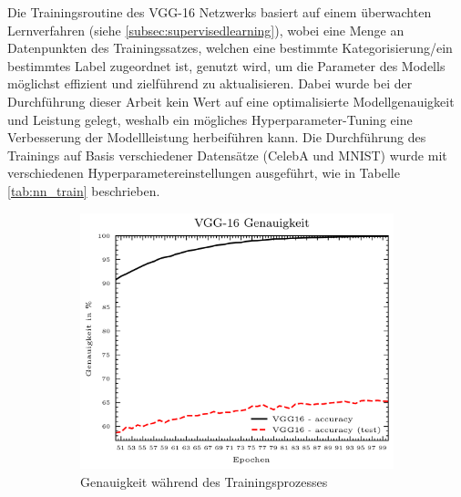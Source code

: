 Die Trainingsroutine des VGG-16 Netzwerks basiert auf einem überwachten Lernverfahren (siehe \ref{subsec:supervisedlearning}), wobei eine Menge an Datenpunkten des Trainingssatzes, welchen eine bestimmte Kategorisierung/ein bestimmtes Label zugeordnet ist, genutzt wird, um die Parameter des Modells möglichst effizient und zielführend zu aktualisieren. Dabei wurde bei der Durchführung dieser Arbeit kein Wert auf eine optimalisierte Modellgenauigkeit und Leistung gelegt, weshalb ein mögliches Hyperparameter-Tuning eine Verbesserung der Modellleistung herbeiführen kann. Die Durchführung des Trainings auf Basis verschiedener Datensätze (CelebA und MNIST) wurde mit verschiedenen Hyperparametereinstellungen ausgeführt, wie in Tabelle \ref{tab:nn_train} beschrieben.
\begin{figure}[H]
	\centering
	\begin{subfigure}[b]{0.35\linewidth}
		\includegraphics[width=\linewidth]{Bilder/celeba_nn_acc.png}
		\caption{Genauigkeit während des Trainingsprozesses}
		\label{img:celeba_nn_acc}
	\end{subfigure}
	\hspace{1cm} %
	\begin{subfigure}[b]{0.35\linewidth}

\end{subfigure}
\end{figure}
